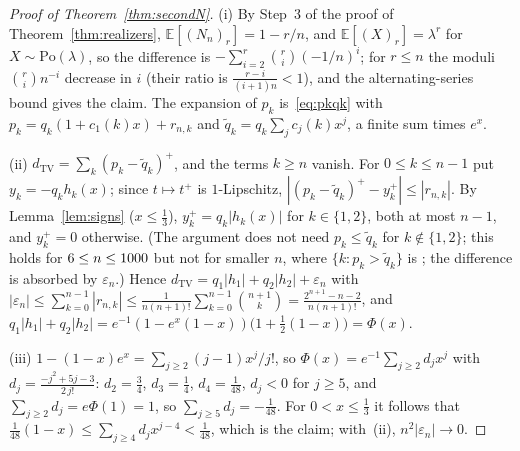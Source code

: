 \documentclass[11pt,a4paper]{article}
\theoremstyle{plain}
\theoremstyle{definition}
\theoremstyle{remark}
\begin{document}
\begin{proof}[Proof of Theorem~\ref{thm:secondN}]
(i) By Step~3 of the proof of Theorem~\ref{thm:realizers}, $\mathbb E[(N_n)_r]=1-r/n$, and $\mathbb E[(X)_r]=\lambda^r$ for $X\sim\mathrm{Po}(\lambda)$, so the difference is $-\sum_{i=2}^r\binom ri(-1/n)^i$; for $r\le n$ the moduli $\binom rin^{-i}$ decrease in $i$ (their ratio is $\frac{r-i}{(i+1)n}<1$), and the alternating-series bound gives the claim. The expansion of $p_k$ is~\eqref{eq:pkqk} with $p_k=q_k(1+c_1(k)x)+r_{n,k}$ and $\tilde q_k=q_k\sum_jc_j(k)x^j$, a finite sum times $e^x$.

(ii) $d_{\mathrm{TV}}=\sum_k(p_k-\tilde q_k)^+$, and the terms $k\ge n$ vanish. For $0\le k\le n-1$ put $y_k=-q_kh_k(x)$; since $t\mapsto t^+$ is $1$-Lipschitz, $|(p_k-\tilde q_k)^+-y_k^+|\le|r_{n,k}|$. By Lemma~\ref{lem:signs} ($x\le\tfrac13$), $y_k^+=q_k|h_k(x)|$ for $k\in\{1,2\}$, both at most $n-1$, and $y_k^+=0$ otherwise. (The argument does not need $p_k\le\tilde q_k$ for $k\notin\{1,2\}$; this holds for $6\le n\le1000$ but not for smaller $n$, where $\{k:p_k>\tilde q_k\}$ is \SecPrecPosSets; the difference is absorbed by $\varepsilon_n$.) Hence $d_{\mathrm{TV}}=q_1|h_1|+q_2|h_2|+\varepsilon_n$ with $|\varepsilon_n|\le\sum_{k=0}^{n-1}|r_{n,k}|\le\frac1{n(n+1)!}\sum_{k=0}^{n-1}\binom{n+1}k=\frac{2^{n+1}-n-2}{n(n+1)!}$, and $q_1|h_1|+q_2|h_2|=e^{-1}(1-e^x(1-x))\bigl(1+\tfrac12(1-x)\bigr)=\Phi(x)$.

(iii) $1-(1-x)e^x=\sum_{j\ge2}(j-1)x^j/j!$, so $\Phi(x)=e^{-1}\sum_{j\ge2}d_jx^j$ with $d_j=\frac{-j^2+5j-3}{2\,j!}$: $d_2=\tfrac34$, $d_3=\tfrac14$, $d_4=\tfrac1{48}$, $d_j<0$ for $j\ge5$, and $\sum_{j\ge2}d_j=e\Phi(1)=1$, so $\sum_{j\ge5}d_j=-\tfrac1{48}$. For $0<x\le\tfrac13$ it follows that $\tfrac1{48}(1-x)\le\sum_{j\ge4}d_jx^{j-4}<\tfrac1{48}$, which is the claim; with~(ii), $n^2|\varepsilon_n|\to0$.
\end{proof}
\end{document}

